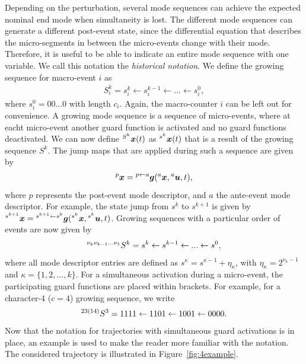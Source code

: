 \documentclass[../DC2017114Bouma.tex]{subfiles}
\begin{document}
Depending on the perturbation, several mode sequences can achieve the expected nominal end mode when simultaneity is lost. The different mode sequences can generate a different post-event state, since the differential equation that describes the micro-segments in between the micro-events change with their mode. Therefore, it is useful to be able to indicate an entire mode sequence with one variable. We call this notation the \textit{historical notation}. We define the growing sequence for macro-event $i$ as 
\begin{align}
S^k_i = s^k_i\leftarrow s^{k-1}_i\leftarrow ... \leftarrow s^0_i,
\end{align}
where $s^0_i = 00...0$ with length $c_i$. Again, the macro-counter $i$ can be left out for convenience. A growing mode sequence is a sequence of micro-events, where at eacht micro-event another guard function is activated and no guard functions deactivated. We can now define $\hspace{0cm}^{S^k}{\boldsymbol{x}}(t)$ as $\hspace{0cm}^{s^k}{\boldsymbol{x}}(t)$ that is a result of the growing sequence $S^k$. The jump maps that are applied during such a sequence are given by
\begin{align}
\hspace{0cm}^{p}{\boldsymbol{x}} = \hspace{0cm}^{p\leftarrow a}{\boldsymbol{g}}(\hspace{0cm}^{a}{\boldsymbol{x}},\hspace{0cm}^{a}{\boldsymbol{u}},t),
\end{align}
where $p$ represents the post-event mode descriptor, and $a$ the ante-event mode descriptor. For example, the state jump from $s^k$ to $s^{k+1}$ is given by $\hspace{0cm}^{s^{k+1}}{\boldsymbol{x}} = \hspace{0cm}^{s^{k+1}\leftarrow s^k}{\boldsymbol{g}}(\hspace{0cm}^{s^k}{\boldsymbol{x}},\hspace{0cm}^{s^k}{\boldsymbol{u}},t)$. Growing sequences with a particular order of events are now given by
\begin{align}
\hspace{0cm}^{\nu_k \nu_{k-1}...\nu_{1}}S^k = s^k \leftarrow s^{k-1} \leftarrow ... \leftarrow s^0,
\end{align}
where all mode descriptor entries are defined as $s^{\kappa} = s^{\kappa-1} + \eta_{\kappa}$, with $\eta_{\kappa} = 2^{\nu_{\kappa}-1}$ and $\kappa = \{1,2,...,k\}$. For a simultaneous activation during a micro-event, the participating guard functions are placed within brackets. For example, for a character-4 ($c = 4$) growing sequence, we write 
\begin{align}
\hspace{0cm}^{23(14)}S^3 = 1111 \leftarrow 1101 \leftarrow 1001 \leftarrow 0000.
\end{align}
%
Now that the notation for trajectories with simultaneous guard activations is in place, an example is used to make the reader more  familiar with the notation. The considered trajectory is illustrated in Figure~\ref{fig:4example}. 
\end{document}
